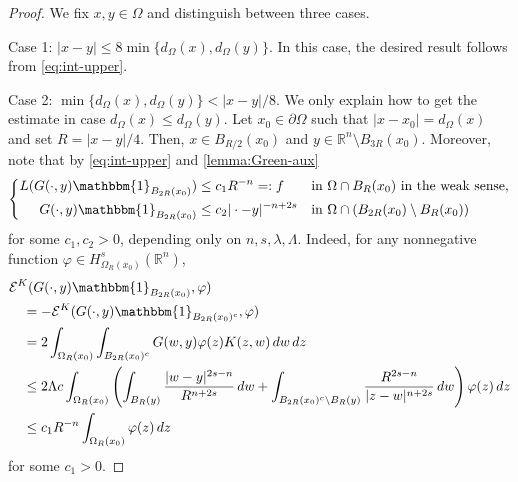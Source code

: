 \documentclass[10pt,a4paper]{amsart}
\newcommand{\R}{\mathbb{R}}
\renewcommand{\d}{\textnormal{\,d}}
\begin{document}
\begin{proof}
We fix $x,y \in \Omega$ and distinguish between three cases.

Case 1: $|x-y| \le 8 \min \{ d_{\Omega}(x) , d_{\Omega}(y) \}$. In this case, the desired result follows from \eqref{eq:int-upper}.

Case 2: $\min\{ d_{\Omega}(x) , d_{\Omega}(y) \} < |x-y|/8$. We only explain how to get the estimate in case $d_{\Omega}(x) \le d_{\Omega}(y)$.
Let $x_0 \in \partial \Omega$ such that $|x-x_0| = d_{\Omega}(x)$ and set $R = |x-y|/4$. Then, $x \in B_{R/2}(x_0)$ and $y \in \R^n \setminus B_{3R}(x_0)$. Moreover, note that by \eqref{eq:int-upper} and \autoref{lemma:Green-aux}
\begin{align*}
\left\{
\begin{aligned}
L(G(\cdot,y)\mathbbm{1}_{B_{2R}(x_0)}) &\le c_1 R^{-n}=:f &&\text{in } \Omega \cap B_{R}(x_0) \text{ in the weak sense}, \\
G(\cdot,y)\mathbbm{1}_{B_{2R}(x_0)} &\le c_2 |\cdot-y|^{-n+2s} &&\text{in } \Omega \cap (B_{2R}(x_0) \setminus B_{R}(x_0))
\end{aligned}
\right.
\end{align*}
for some $c_1, c_2 > 0$, depending only on $n,s,\lambda,\Lambda$. Indeed, for any nonnegative function $\varphi \in H^s_{\Omega_R(x_0)}(\R^n)$,
\begin{align*}
&\mathcal{E}^K(G(\cdot, y) \mathbbm{1}_{B_{2R}(x_0)}, \varphi) \\
&\quad = - \mathcal{E}^K(G(\cdot, y) \mathbbm{1}_{B_{2R}(x_0)^c}, \varphi) \\
&\quad = 2\int_{\Omega_R(x_0)} \int_{B_{2R}(x_0)^c} G(w, y) \varphi(z) K(z, w) \d w \d z \\
&\quad \leq 2\Lambda c \int_{\Omega_R(x_0)} \left( \int_{B_R(y)} \frac{|w-y|^{2s-n}}{R^{n+2s}} \d w + \int_{B_{2R}(x_0)^c \setminus B_R(y)} \frac{R^{2s-n}}{|z-w|^{n+2s}} \d w \right) \varphi(z) \d z \\
&\quad \leq c_1 R^{-n} \int_{\Omega_R(x_0)} \varphi(z) \d z
\end{align*}
for some $c_1>0$.


\end{proof}
\end{document}
